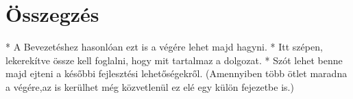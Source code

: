 \chapter{Összegzés}

* A Bevezetéshez hasonlóan ezt is a végére lehet majd hagyni.
* Itt szépen, lekerekítve össze kell foglalni, hogy mit tartalmaz a dolgozat.
* Szót lehet benne majd ejteni a későbbi fejlesztési lehetőségekről. (Amennyiben több ötlet maradna a végére,az is kerülhet még közvetlenül ez elé egy külön fejezetbe is.)
